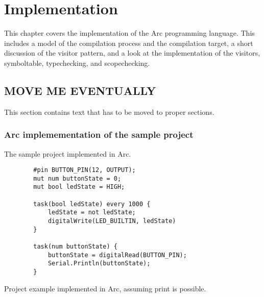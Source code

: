 \chapter{Implementation}\label{cha:implementation}
This chapter covers the implementation of the Arc programming language. This includes a model of the compilation process and the compilation target, a short discussion of the visitor pattern, and a look at the implementation of the visitors, symboltable, typechecking, and scopechecking.











\section{MOVE ME EVENTUALLY}
This section contains text that has to be moved to proper sections.

\subsection*{Arc implemementation of the sample project}
The sample project implemented in Arc.

\begin{listing}[htb!]
    \begin{verbatim}
        #pin BUTTON_PIN(12, OUTPUT);
        mut num buttonState = 0;
        mut bool ledState = HIGH;

        task(bool ledState) every 1000 {
            ledState = not ledState;
            digitalWrite(LED_BUILTIN, ledState)
        }

        task(num buttonState) {
            buttonState = digitalRead(BUTTON_PIN);
            Serial.Println(buttonState);
        }
    \end{verbatim}
    \caption{Project example implemented in Arc, assuming print is possible.}
    \label{lst:arcexample}
\end{listing}
